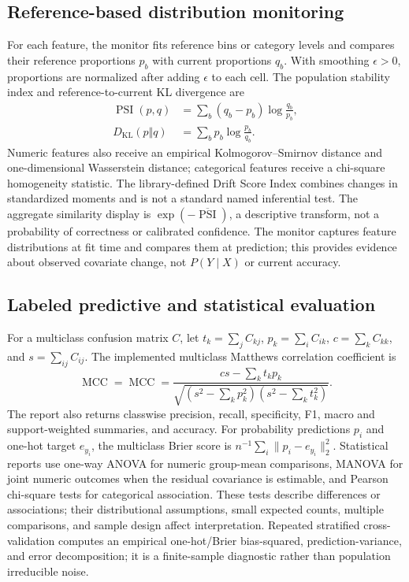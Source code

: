 \documentclass[conference]{IEEEtran}
\begin{document}
\subsection{Reference-based distribution monitoring}
For each feature, the monitor fits reference bins or category levels and compares their reference proportions \(p_b\) with current proportions \(q_b\). With smoothing \(\epsilon>0\), proportions are normalized after adding \(\epsilon\) to each cell. The population stability index and reference-to-current KL divergence are
\[
\begin{aligned}
\operatorname{PSI}(p,q)&=\sum_b(q_b-p_b)\log\frac{q_b}{p_b},\\
D_{\mathrm{KL}}(p\Vert q)&=\sum_b p_b\log\frac{p_b}{q_b}.
\end{aligned}
\]
Numeric features also receive an empirical Kolmogorov--Smirnov distance and one-dimensional Wasserstein distance; categorical features receive a chi-square homogeneity statistic. The library-defined Drift Score Index combines changes in standardized moments and is not a standard named inferential test. The aggregate similarity display is \(\exp(-\overline{\operatorname{PSI}})\), a descriptive transform, not a probability of correctness or calibrated confidence. The monitor captures feature distributions at fit time and compares them at prediction; this provides evidence about observed covariate change, not \(P(Y\mid X)\) or current accuracy.

\subsection{Labeled predictive and statistical evaluation}
For a multiclass confusion matrix \(C\), let \(t_k=\sum_j C_{kj}\), \(p_k=\sum_i C_{ik}\), \(c=\sum_k C_{kk}\), and \(s=\sum_{ij}C_{ij}\). The implemented multiclass Matthews correlation coefficient \cite{mcc} is
\[
\operatorname{MCC}=
\operatorname{MCC}=
\frac{cs-\sum_k t_kp_k}
{\sqrt{(s^2-\sum_k p_k^2)(s^2-\sum_k t_k^2)}}.
\]
The report also returns classwise precision, recall, specificity, F1, macro and support-weighted summaries, and accuracy. For probability predictions \(p_i\) and one-hot target \(e_{y_i}\), the multiclass Brier score is \(n^{-1}\sum_i\|p_i-e_{y_i}\|_2^2\). Statistical reports use one-way ANOVA for numeric group-mean comparisons, MANOVA for joint numeric outcomes when the residual covariance is estimable, and Pearson chi-square tests for categorical association. These tests describe differences or associations; their distributional assumptions, small expected counts, multiple comparisons, and sample design affect interpretation. Repeated stratified cross-validation computes an empirical one-hot/Brier bias-squared, prediction-variance, and error decomposition; it is a finite-sample diagnostic rather than population irreducible noise.
\end{document}

